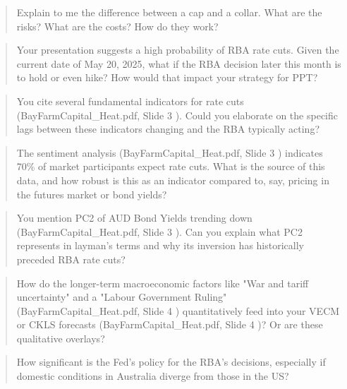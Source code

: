 \documentclass[11pt, a4paper, british]{article}
\begin{document}
\newpage

\begin{quote}
    Explain to me the difference between a cap and a collar. What are the risks? What are the costs? How do they work?
\end{quote}

\begin{quote}
    Your presentation suggests a high probability of RBA rate cuts. Given the current date of May 20, 2025, what if the RBA decision later this month is to hold or even hike? How would that impact your strategy for PPT?
\end{quote}

\begin{quote}
    You cite several fundamental indicators for rate cuts (BayFarmCapital_Heat.pdf, Slide 3 ). Could you elaborate on the specific lags between these indicators changing and the RBA typically acting?
\end{quote}

\begin{quote}
    The sentiment analysis (BayFarmCapital_Heat.pdf, Slide 3 ) indicates 70\% of market participants expect rate cuts. What is the source of this data, and how robust is this as an indicator compared to, say, pricing in the futures market or bond yields?
\end{quote}

\begin{quote}
    You mention PC2 of AUD Bond Yields trending down (BayFarmCapital_Heat.pdf, Slide 3 ). Can you explain what PC2 represents in layman's terms and why its inversion has historically preceded RBA rate cuts?
\end{quote}

\begin{quote}
    How do the longer-term macroeconomic factors like "War and tariff uncertainty" and a "Labour Government Ruling" (BayFarmCapital_Heat.pdf, Slide 4 ) quantitatively feed into your VECM or CKLS forecasts (BayFarmCapital_Heat.pdf, Slide 4 )? Or are these qualitative overlays?
\end{quote}

\newpage

\begin{quote}
    How significant is the Fed's policy for the RBA's decisions, especially if domestic conditions in Australia diverge from those in the US?
\end{quote}
\end{document}
